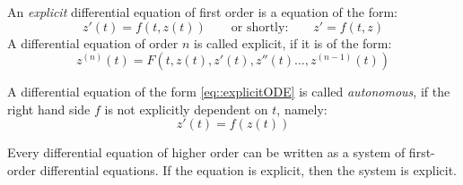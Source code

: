 \begin{definition}
	An \textit{explicit} differential equation of first order is	a equation of the form:
	\begin{equation}
		z'(t)=f\left(t,z(t)\right) \qquad \text{or shortly:} \qquad z'=f\left(t,z\right)
		\label{eq::explicitODE}
	\end{equation}
	A differential equation of order $n$ is called explicit, if it is of the form:
	\begin{equation}
		z^{(n)}(t) = F\left(t,z(t),z'(t),z''(t)\dots,z^{(n-1)}(t)\right)
	\end{equation}
\end{definition}

\begin{definition}
	A differential equation of the form \eqref{eq::explicitODE} is called	\textit{autonomous}, if the right hand side $f$ is not explicitly dependent on $t$, namely:
	\begin{equation}
		z'(t)=f\left(z(t)\right)
	\end{equation}
\end{definition}

\begin{lemma}
	Every differential equation of higher order can be written as a system of first-order differential equations. If the equation is explicit, then the system is explicit.
\end{lemma}

